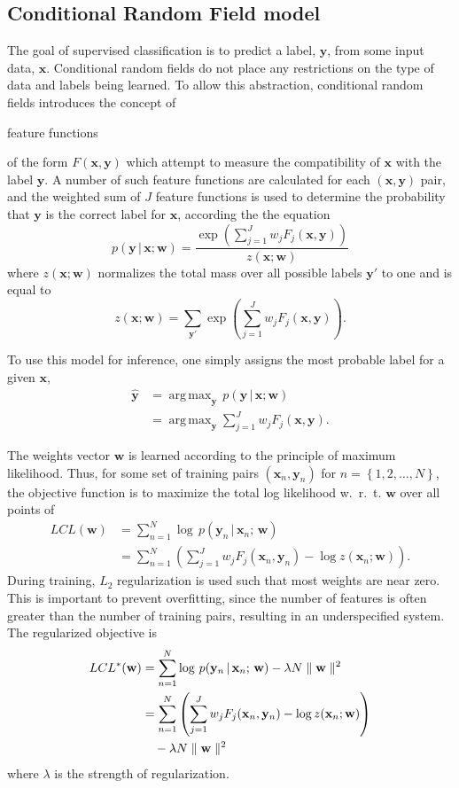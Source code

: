 \documentclass[10pt,twocolumn,letterpaper]{article}
\newcommand{\x}{\mathbf{x}}
\newcommand{\y}{\mathbf{y}}
\newcommand{\w}{\mathbf{w}}
\DeclareMathOperator*{\argmax}{arg\,max}
\begin{document}
\subsection{Conditional Random Field model}



The goal of supervised classification is to predict a label, $\y$, from some input data, $\x$. Conditional random fields do not place any restrictions on the type of data and labels being learned. To allow this abstraction, conditional random fields introduces the concept of \begin{em}feature functions\end{em} of the form $F(\x,\y)$ which attempt to measure the compatibility of $\x$ with the label $\y$. A number of such feature functions are calculated for each $(\x,\y)$ pair, and the weighted sum of $J$ feature functions is used to determine the probability that $\y$ is the correct label for $\x$, according the the equation
\begin{equation}
	p(\y\,|\,\x;\w) = \frac{\exp \left( \sum_{j=1}^J w_j F_j (\x,\y) \right)}{z(\x;\w)}
\end{equation}
where $z(\x;\w)$ normalizes the total mass over all possible labels $\y'$ to one and is equal to
\begin{equation}
	z(\x;\w) = \sum_{\y'} \exp \left( \sum_{j=1}^J w_j F_j (\x,\y) \right). \label{Eq:partition}
\end{equation}

To use this model for inference, one simply assigns the most probable label for a given $\x$,
\begin{align}
	\hat{\y} & =\argmax_{\y} \, p(\y\,|\,\x;\w) \\
		&= \argmax_{\y} \sum_{j=1}^J w_j F_j(\x,\y).
		\label{equation}
\end{align}


The weights vector $\w$ is learned according to the principle of maximum likelihood. Thus, for some set of training pairs $(\x_n,\y_n)$ for $n=\left\{1,2,\dots,N\right\}$, the objective function is to maximize the total log likelihood w.~r.~t. $\w$ over all points of
\begin{align}
	LCL(\w) &= \sum_{n=1}^N \log\,p(\y_n\,|\,\x_n ;\,\w) \\
		&= \sum_{n=1}^N \left( \sum_{j=1}^J w_j F_j (\x_n,\y_n) - \log z(\x_n;\w) \right).
\end{align}
During training, $L_2$ regularization is used such that most weights are near zero. This is important to prevent overfitting, since the number of features is often greater than the number of training pairs, resulting in an underspecified system. The regularized objective is
\begin{align}
	LCL^*(\w) &= \sum_{n=1}^N \log\,p(\y_n\,|\,\x_n ;\,\w) - \lambda N\parallel \w \parallel^2 \\
		&= \sum_{n=1}^N \left( \sum_{j=1}^J w_j F_j (\x_n,\y_n)  - \log z(\x_n;\w) \right) \notag \\
		&\hspace{1 em}  - \lambda N\parallel \w \parallel^2
		\label{Eq:rLCL}
\end{align}
where $\lambda$ is the strength of regularization.
\end{document}
